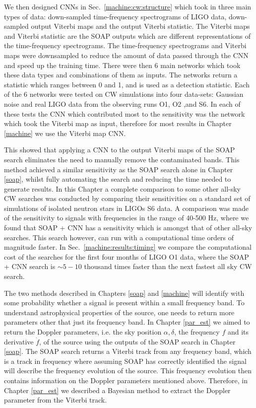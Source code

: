 We then designed \glspl{CNN} in Sec.~\ref{machine:cw:structure} which took in three main types of data: down-sampled time-frequency spectrograms of \gls{LIGO} data, down-sampled output Viterbi maps and the output Viterbi statistic.
The Viterbi maps and Viterbi statistic are the SOAP outputs which are different representations of the time-frequency spectrograms.
The time-frequency spectrograms and Viterbi maps were downsampled to reduce the amount of data passed through the \gls{CNN} and speed up the training time.
There were then 6 main networks which took these data types and combinations of them as inputs. 
The networks return a statistic which ranges between 0 and 1, and is used as a detection statistic. 
Each of the 6 networks were tested on \gls{CW} simulations into four data-sets: Gaussian noise and real \gls{LIGO} data from the observing runs O1, O2 ,and S6.
In each of these tests the \gls{CNN} which contributed most to the sensitivity was the network which took the Viterbi map as input, therefore for most results in Chapter \ref{machine} we use the Viterbi map \gls{CNN}. 

This showed that applying a \gls{CNN} to the output Viterbi maps of the SOAP search eliminates the need to manually remove the contaminated bands.
This method achieved a similar sensitivity as the SOAP search alone in Chapter \ref{soap}, whilst fully automating the search and reducing the time needed to generate results.
In this Chapter a complete comparison to some other all-sky \gls{CW} searches was conducted by comparing their sensitivities on a standard set of simulations of isolated neutron stars in \glspl{LIGO} S6 data.
A comparison was made of the sensitivity to signals with frequencies in the range of 40-500 Hz, where we found that SOAP + \gls{CNN} has a sensitivity which is amongst that of other all-sky searches.
This search however, can run with a computational time orders of magnitude faster. In Sec.~\ref{machine:results:timing} we compare the computational cost of the searches for the first four months of \gls{LIGO} O1 data, where the SOAP + \gls{CNN} search is $\sim 5 - 10$ thousand times faster than the next fastest all sky \gls{CW} search.

\bigskip

The two methods described in Chapters \ref{soap} and \ref{machine} will identify with some probability whether a signal is present within a small frequency band.
To understand astrophysical properties of the source, one needs to return more parameters other that just its frequency band.
In Chapter \ref{par_est} we aimed to return the Doppler parameters, i.e. the sky position $\alpha, \delta$, the frequency $f$ and its derivative $\dot{f}$, of the source using the outputs of the SOAP search in Chapter \ref{soap}.
The SOAP search returns a Viterbi track from any frequency band, which is a track in frequency where assuming SOAP has correctly identified the signal will describe the frequency evolution of the source.
This frequency evolution then contains information on the Doppler parameters mentioned above. 
Therefore, in Chapter \ref{par_est} we described a Bayesian method to extract the Doppler parameter from the Viterbi track.

